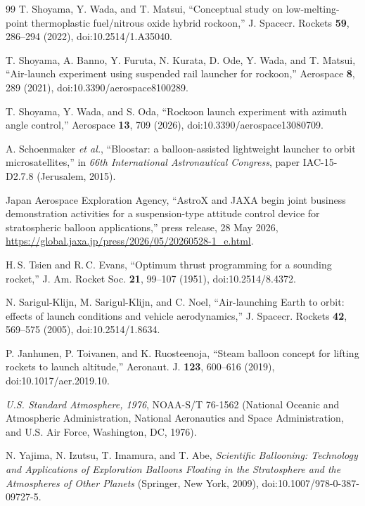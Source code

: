 \documentclass[11pt,a4paper]{article}
\begin{document}
\begin{thebibliography}{99}
 T. Shoyama, Y. Wada, and T. Matsui, ``Conceptual study on low-melting-point thermoplastic fuel/nitrous oxide hybrid rockoon,'' J. Spacecr. Rockets \textbf{59}, 286--294 (2022), doi:10.2514/1.A35040.

 T. Shoyama, A. Banno, Y. Furuta, N. Kurata, D. Ode, Y. Wada, and T. Matsui, ``Air-launch experiment using suspended rail launcher for rockoon,'' Aerospace \textbf{8}, 289 (2021), doi:10.3390/aerospace8100289.

 T. Shoyama, Y. Wada, and S. Oda, ``Rockoon launch experiment with azimuth angle control,'' Aerospace \textbf{13}, 709 (2026), doi:10.3390/aerospace13080709.

 A. Schoenmaker \emph{et al.}, ``Bloostar: a balloon-assisted lightweight launcher to orbit microsatellites,'' in \emph{66th International Astronautical Congress}, paper IAC-15-D2.7.8 (Jerusalem, 2015).

 Japan Aerospace Exploration Agency, ``AstroX and JAXA begin joint business demonstration activities for a suspension-type attitude control device for stratospheric balloon applications,'' press release, 28 May 2026, \url{https://global.jaxa.jp/press/2026/05/20260528-1_e.html}.

 H.\,S. Tsien and R.\,C. Evans, ``Optimum thrust programming for a sounding rocket,'' J. Am. Rocket Soc. \textbf{21}, 99--107 (1951), doi:10.2514/8.4372.

 N. Sarigul-Klijn, M. Sarigul-Klijn, and C. Noel, ``Air-launching Earth to orbit: effects of launch conditions and vehicle aerodynamics,'' J. Spacecr. Rockets \textbf{42}, 569--575 (2005), doi:10.2514/1.8634.

 P. Janhunen, P. Toivanen, and K. Ruosteenoja, ``Steam balloon concept for lifting rockets to launch altitude,'' Aeronaut. J. \textbf{123}, 600--616 (2019), doi:10.1017/aer.2019.10.

 \emph{U.S. Standard Atmosphere, 1976}, NOAA-S/T 76-1562 (National Oceanic and Atmospheric Administration, National Aeronautics and Space Administration, and U.S. Air Force, Washington, DC, 1976).

 N. Yajima, N. Izutsu, T. Imamura, and T. Abe, \emph{Scientific Ballooning: Technology and Applications of Exploration Balloons Floating in the Stratosphere and the Atmospheres of Other Planets} (Springer, New York, 2009), doi:10.1007/978-0-387-09727-5.


\end{thebibliography}
\end{document}
